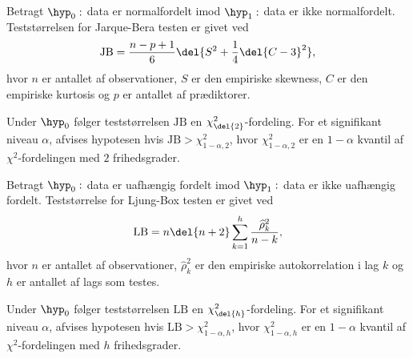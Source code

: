 \begin{defn}
Betragt \(\hyp_0: \) data er normalfordelt imod \(\hyp_1:\) data er ikke normalfordelt.
Teststørrelsen for Jarque-Bera testen er givet ved
\begin{align*}
\text{JB} = \frac{n-p+1}{6} \del{S^2 + \frac{1}{4} \del{C-3}^2},
\end{align*}
hvor \(n\) er antallet af observationer, \(S\) er den empiriske skewness, \(C\) er den empiriske kurtosis og \(p\) er antallet af prædiktorer.
\end{defn}
Under \(\hyp_0\) følger teststørrelsen \(\text{JB}\) en \(\chi_{\del{2}}^2\)-fordeling.
For et signifikant niveau \(\alpha\), afvises hypotesen hvis \(\text{JB} > \chi_{1-\alpha,2}^2\), hvor \(\chi_{1-\alpha,2}^2\) er en \(1 - \alpha\) kvantil af \(\chi^2\)-fordelingen med \(2\) frihedsgrader.

\begin{defn}
Betragt \(\hyp_0 :\) data er uafhængig fordelt imod \(\hyp_1 :\) data er ikke uafhængig fordelt.
Teststørrelse for Ljung-Box testen er givet ved
\begin{align*}
\text{LB} = n \del{n +2} \sum_{k=1}^h \frac{\widehat{\rho}_k^2}{n-k},
\end{align*}
hvor \(n\) er antallet af observationer, \(\widehat{\rho}_k^2\) er den empiriske autokorrelation i lag \(k\) og \(h\) er antallet af lags som testes.
\end{defn}
Under \(\hyp_0\) følger teststørrelsen \(\text{LB}\) en \(\chi_{\del{h}}^2\)-fordeling.
For et signifikant niveau \(\alpha\), afvises hypotesen hvis \(\text{LB} > \chi_{1-\alpha,h}^2\), hvor \(\chi_{1-\alpha,h}^2\) er en \(1 - \alpha\) kvantil af \(\chi^2\)-fordelingen med \(h\) frihedsgrader.


